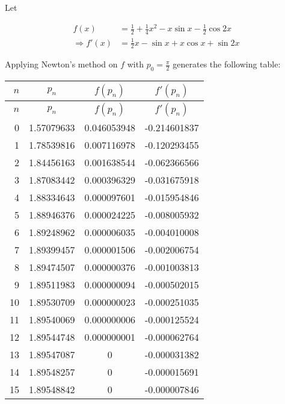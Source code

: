 \documentclass[../../../../Assignments]{subfiles}
\begin{document}
\begin{solution}
    Let

    \begin{align*}
                     f(x) &= \frac{1}{2} + \frac{1}{4} x^2 - x \sin{x} - \frac{1}{2} \cos{2x} \\
        \Rightarrow f'(x) &= \frac{1}{2} x - \sin{x} + x \cos{x} + \sin{2x}
    \end{align*}

    Applying Newton's method on \(f\) with \(p_0 = \frac{\pi}{2}\) generates the
    following table:

    \begin{longtable}{r S[table-format=1.8] S[table-format=1.9] S[table-format=-1.9]}
        \toprule
        \(n\)  &   {\(p_n\)}   &  {\(f(p_n)\)}  &  {\(f'(p_n)\)}  \\
        \midrule
        \endfirsthead
        \(n\)  &   {\(p_n\)}   &  {\(f(p_n)\)}  &  {\(f'(p_n)\)}  \\
        \midrule
          &  1.57079633   &  0.046053948    &  -0.214601837  \\
            1  &  1.78539816   &  0.007116978    &  -0.120293455  \\
            2  &  1.84456163   &  0.001638544    &  -0.062366566  \\
            3  &  1.87083442   &  0.000396329    &  -0.031675918  \\
            4  &  1.88334643   &  0.000097601    &  -0.015954846  \\
            5  &  1.88946376   &  0.000024225    &  -0.008005932  \\
            6  &  1.89248962   &  0.000006035    &  -0.004010008  \\
            7  &  1.89399457   &  0.000001506    &  -0.002006754  \\
            8  &  1.89474507   &  0.000000376    &  -0.001003813  \\
            9  &  1.89511983   &  0.000000094    &  -0.000502015  \\
           10  &  1.89530709   &  0.000000023    &  -0.000251035  \\
           11  &  1.89540069   &  0.000000006    &  -0.000125524  \\
           12  &  1.89544748   &  0.000000001    &  -0.000062764  \\
           13  &  1.89547087   &  0              &  -0.000031382  \\
           14  &  1.89548257   &  0              &  -0.000015691  \\
           15  &  1.89548842   &  0              &  -0.000007846  \\
        \bottomrule
    \end{longtable}


\end{solution}
\end{document}
